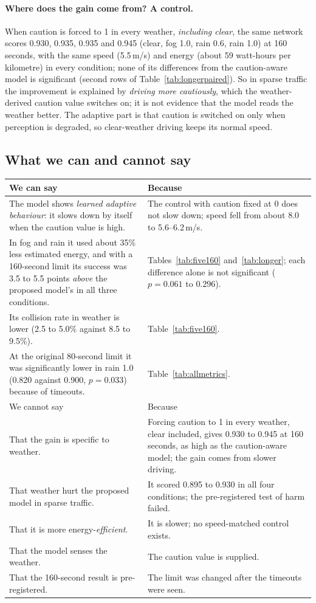 \documentclass[11pt,a4paper]{article}
\begin{document}
\paragraph{Where does the gain come from? A control.} When caution is forced to 1 in every weather, \emph{including clear}, the same network scores 0.930, 0.935, 0.935 and 0.945 (clear, fog 1.0, rain 0.6, rain 1.0) at 160 seconds, with the same speed (5.5\,m/s) and energy (about 59 watt-hours per kilometre) in every condition; none of its differences from the caution-aware model is significant (second rows of Table~\ref{tab:longerpaired}). So in sparse traffic the improvement is explained by \emph{driving more cautiously}, which the weather-derived caution value switches on; it is not evidence that the model reads the weather better. The adaptive part is that caution is switched on only when perception is degraded, so clear-weather driving keeps its normal speed.
\subsection{What we can and cannot say}
\begin{tabularx}{\textwidth}{@{}>{\raggedright\arraybackslash}p{5.2cm}X@{}}\toprule
We can say & Because\\\midrule
The model shows \emph{learned adaptive behaviour}: it slows down by itself when the caution value is high. & The control with caution fixed at 0 does not slow down; speed fell from about 8.0 to 5.6--6.2\,m/s.\\
In fog and rain it used about 35\% less estimated energy, and with a 160-second limit its success was 3.5 to 5.5 points \emph{above} the proposed model's in all three conditions. & Tables~\ref{tab:five160} and~\ref{tab:longer}; each difference alone is not significant ($p=0.061$ to $0.296$).\\
Its collision rate in weather is lower (2.5 to 5.0\% against 8.5 to 9.5\%). & Table~\ref{tab:five160}.\\
At the original 80-second limit it was significantly lower in rain 1.0 (0.820 against 0.900, $p=0.033$) because of timeouts. & Table~\ref{tab:allmetrics}.\\\midrule
We cannot say & Because\\\midrule
That the gain is specific to weather. & Forcing caution to 1 in every weather, clear included, gives 0.930 to 0.945 at 160 seconds, as high as the caution-aware model; the gain comes from slower driving.\\
That weather hurt the proposed model in sparse traffic. & It scored 0.895 to 0.930 in all four conditions; the pre-registered test of harm failed.\\
That it is more energy-\emph{efficient}. & It is slower; no speed-matched control exists.\\
That the model senses the weather. & The caution value is supplied.\\
That the 160-second result is pre-registered. & The limit was changed after the timeouts were seen.\\\bottomrule
\end{tabularx}
\end{document}
